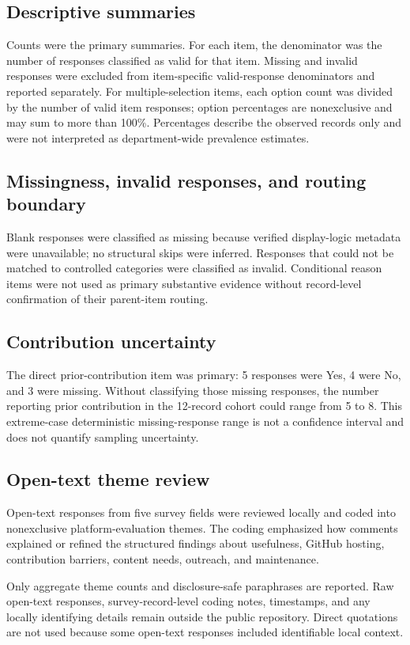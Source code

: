 \documentclass[11pt]{article}
\begin{document}
\subsection{Descriptive summaries}
Counts were the primary summaries. For each item, the denominator was the number of responses classified as valid for that item. Missing and invalid responses were excluded from item-specific valid-response denominators and reported separately. For multiple-selection items, each option count was divided by the number of valid item responses; option percentages are nonexclusive and may sum to more than 100\%. Percentages describe the observed records only and were not interpreted as department-wide prevalence estimates.

\subsection{Missingness, invalid responses, and routing boundary}
Blank responses were classified as missing because verified display-logic metadata were unavailable; no structural skips were inferred. Responses that could not be matched to controlled categories were classified as invalid. Conditional reason items were not used as primary substantive evidence without record-level confirmation of their parent-item routing.

\subsection{Contribution uncertainty}
The direct prior-contribution item was primary: 5 responses were Yes, 4 were No, and 3 were missing. Without classifying those missing responses, the number reporting prior contribution in the 12-record cohort could range from 5 to 8. This extreme-case deterministic missing-response range is not a confidence interval and does not quantify sampling uncertainty.

\subsection{Open-text theme review}
Open-text responses from five survey fields were reviewed locally and coded into nonexclusive platform-evaluation themes. The coding emphasized how comments explained or refined the structured findings about usefulness, GitHub hosting, contribution barriers, content needs, outreach, and maintenance.

Only aggregate theme counts and disclosure-safe paraphrases are reported. Raw open-text responses, survey-record-level coding notes, timestamps, and any locally identifying details remain outside the public repository. Direct quotations are not used because some open-text responses included identifiable local context.
\end{document}
